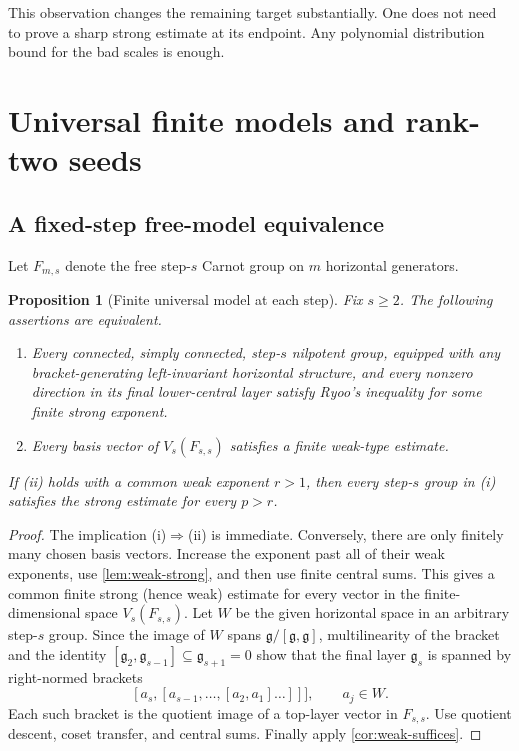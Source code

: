\documentclass[11pt]{article}
\newtheorem{proposition}[theorem]{Proposition}
\theoremstyle{definition}
\theoremstyle{remark}
\newcommand{\g}{\mathfrak g}
\begin{document}
This observation changes the remaining target substantially.  One does not need to prove
a sharp strong estimate at its endpoint.  Any polynomial distribution bound for the bad
scales is enough.

\section{Universal finite models and rank-two seeds}\label{sec:free}

\subsection{A fixed-step free-model equivalence}

Let \(F_{m,s}\) denote the free step-\(s\) Carnot group on \(m\) horizontal generators.

\begin{proposition}[Finite universal model at each step]\label{prop:free-model}
Fix \(s\ge2\).  The following assertions are equivalent.
\begin{enumerate}[label=(\roman*)]
\item Every connected, simply connected, step-\(s\) nilpotent group, equipped with any
bracket-generating left-invariant horizontal structure, and every nonzero direction in its
final lower-central layer satisfy Ryoo's inequality for some finite strong exponent.
\item Every basis vector of \(V_s(F_{s,s})\) satisfies a finite weak-type estimate.
\end{enumerate}
If (ii) holds with a common weak exponent \(r>1\), then every step-\(s\) group in (i)
satisfies the strong estimate for every \(p>r\).
\end{proposition}

\begin{proof}
The implication (i)\(\Rightarrow\)(ii) is immediate.  Conversely, there are only finitely many chosen basis vectors.  Increase the exponent
past all of their weak exponents, use \cref{lem:weak-strong}, and then use finite central
sums.  This gives a common finite strong (hence weak) estimate for every vector in the
finite-dimensional space \(V_s(F_{s,s})\).  Let \(W\) be the given horizontal space in an
arbitrary step-\(s\) group.  Since the image of \(W\) spans \(\g/[\g,\g]\), multilinearity
of the bracket and the identity \([\g_2,\g_{s-1}]\subseteq\g_{s+1}=0\) show that the final
layer \(\g_s\) is spanned by right-normed brackets
\[
 [a_s,[a_{s-1},\ldots,[a_2,a_1]\ldots]]],\qquad a_j\in W.
\]
Each such bracket is the quotient image of a top-layer vector in \(F_{s,s}\).  Use
quotient descent, coset transfer, and central sums.  Finally apply
\cref{cor:weak-suffices}.
\end{proof}
\end{document}
